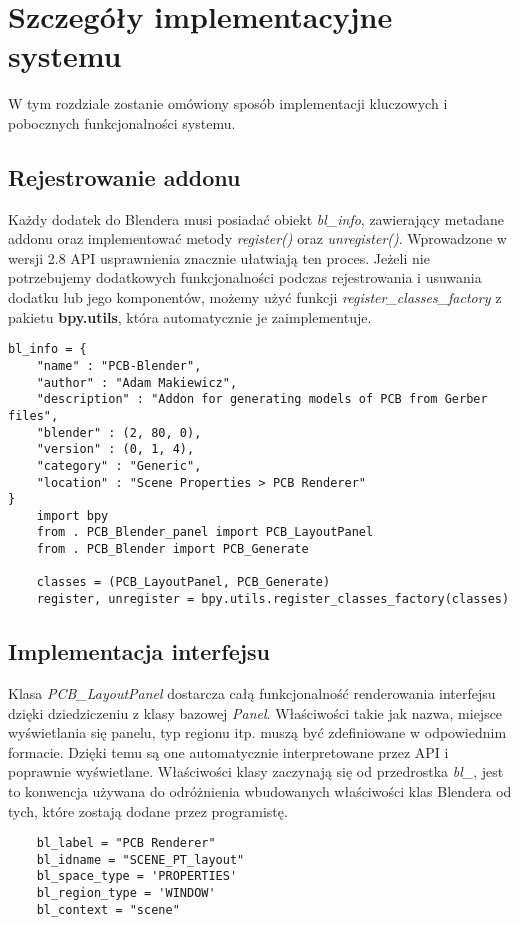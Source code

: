 \documentclass[brudnopis]{xmgr}
\begin{document}
\chapter{Szczegóły implementacyjne systemu}
W tym rozdziale zostanie omówiony sposób implementacji kluczowych i pobocznych funkcjonalności systemu.
\section {Rejestrowanie addonu}
Każdy dodatek do Blendera musi posiadać obiekt \emph{bl\_info}, zawierający metadane addonu oraz implementować metody \emph{register()} oraz \emph{unregister()}. Wprowadzone w wersji 2.8 API usprawnienia znacznie ułatwiają ten proces. Jeżeli nie potrzebujemy dodatkowych funkcjonalności podczas rejestrowania i usuwania dodatku lub jego komponentów, możemy użyć funkcji \emph{register\_classes\_factory} z pakietu \textbf{bpy.utils}, która automatycznie je zaimplementuje.

\begin{lstlisting}
bl_info = {
	"name" : "PCB-Blender",
	"author" : "Adam Makiewicz",
	"description" : "Addon for generating models of PCB from Gerber files",
	"blender" : (2, 80, 0),
	"version" : (0, 1, 4),
	"category" : "Generic",
	"location" : "Scene Properties > PCB Renderer"
}
	import bpy
	from . PCB_Blender_panel import PCB_LayoutPanel
	from . PCB_Blender import PCB_Generate

	classes = (PCB_LayoutPanel, PCB_Generate)
	register, unregister = bpy.utils.register_classes_factory(classes)
\end{lstlisting}

\section {Implementacja interfejsu}

Klasa \emph{PCB\_LayoutPanel} dostarcza całą funkcjonalność renderowania interfejsu dzięki dziedziczeniu z klasy bazowej \emph{Panel}. Właściwości takie jak nazwa, miejsce wyświetlania się panelu, typ regionu itp. muszą być zdefiniowane w odpowiednim formacie. Dzięki temu są one automatycznie interpretowane przez API i poprawnie wyświetlane. Właściwości klasy zaczynają się od przedrostka \emph{bl\_}, jest to konwencja używana do odróżnienia wbudowanych właściwości klas Blendera od tych, które zostają dodane przez programistę.

\begin{lstlisting}
	bl_label = "PCB Renderer"
	bl_idname = "SCENE_PT_layout"
	bl_space_type = 'PROPERTIES'
	bl_region_type = 'WINDOW'
	bl_context = "scene"
\end{lstlisting}
\end{document}
